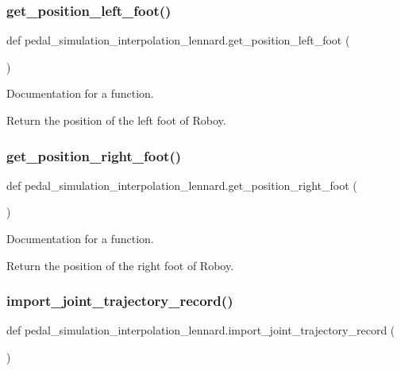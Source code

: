 \subsubsection{\texorpdfstring{get\_position\_left\_foot()}{get\_position\_left\_foot()}}
{\footnotesize\ttfamily def pedal\+\_\+simulation\+\_\+interpolation\+\_\+lennard.\+get\+\_\+position\+\_\+left\+\_\+foot (\begin{DoxyParamCaption}{ }\end{DoxyParamCaption})}



Documentation for a function. 

Return the position of the left foot of Roboy. \mbox{\label{namespacepedal__simulation__interpolation__lennard_ae122a0520bf1276f3c17d952ecc326e7}} 
\subsubsection{\texorpdfstring{get\_position\_right\_foot()}{get\_position\_right\_foot()}}
{\footnotesize\ttfamily def pedal\+\_\+simulation\+\_\+interpolation\+\_\+lennard.\+get\+\_\+position\+\_\+right\+\_\+foot (\begin{DoxyParamCaption}{ }\end{DoxyParamCaption})}



Documentation for a function. 

Return the position of the right foot of Roboy. \mbox{\label{namespacepedal__simulation__interpolation__lennard_a1788cd58724313e3c344b3a39eb4869b}} 
\subsubsection{\texorpdfstring{import\_joint\_trajectory\_record()}{import\_joint\_trajectory\_record()}}
{\footnotesize\ttfamily def pedal\+\_\+simulation\+\_\+interpolation\+\_\+lennard.\+import\+\_\+joint\+\_\+trajectory\+\_\+record (\begin{DoxyParamCaption}{ }\end{DoxyParamCaption})}



